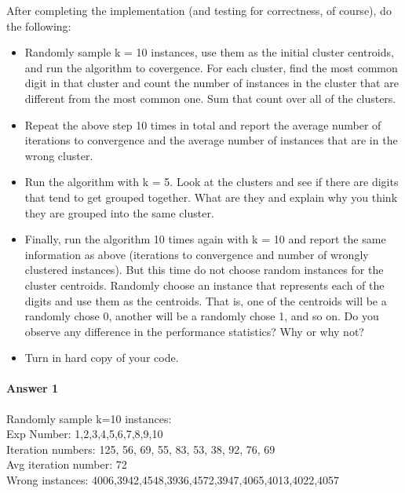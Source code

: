 \documentclass[paper=a4, fontsize=11pt]{scrartcl} %
\numberwithin{equation}{section} %
\numberwithin{figure}{section} %
\numberwithin{table}{section} %
\begin{document}
After completing the implementation (and testing for correctness, of course), do the following: 
\begin{itemize}

 \item  Randomly sample k = 10 instances, use them as the initial cluster centroids, and run the algorithm to covergence. For each cluster, find the most common digit in that cluster and count the number of instances in the cluster that are different from the most common one. Sum that count over all of the clusters.
 \item   Repeat the above step 10 times in total and report the average number of iterations to convergence and the average number of instances that are in the wrong cluster.
 \item   Run the algorithm with k = 5. Look at the clusters and see if there are digits that tend to get grouped together. What are they and explain why you think they are grouped into the same cluster.
  \item  Finally, run the algorithm 10 times again with k = 10 and report the same information as above (iterations to convergence and number of wrongly clustered instances). But this time do not choose random instances for the cluster centroids. Randomly choose an instance that represents each of the digits and use them as the centroids. That is, one of the centroids will be a randomly chose 0, another will be a randomly chose 1, and so on. Do you observe any difference in the performance statistics? Why or why not?
 \item   Turn in hard copy of your code. 

\end{itemize}

\paragraph{Answer 1}
Randomly sample k=10 instances: \\

Exp Number:  1,2,3,4,5,6,7,8,9,10\\

Iteration numbers: 125, 56, 69, 55, 83, 53, 38, 92, 76, 69\\

Avg iteration number: 72 \\

Wrong instances: 4006,3942,4548,3936,4572,3947,4065,4013,4022,4057 \\
\end{document}
